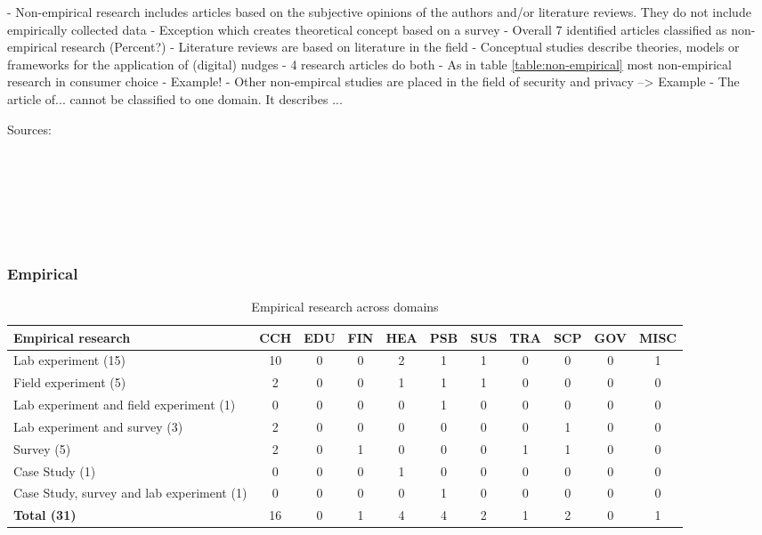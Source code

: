 - Non-empirical research includes articles based on the subjective opinions of the authors and/or literature reviews. They do not include empirically collected data \cite{alavi_review_1992}
- Exception \cite{gamliel_average_2017} which creates theoretical concept based on a survey
- Overall 7 identified articles classified as non-empirical research (Percent?)
- Literature reviews are based on literature in the field
- Conceptual studies describe theories, models or frameworks for the application of (digital) nudges
- 4 research articles do both
- As in table \ref{table:non-empirical} most non-empirical research in consumer choice
- Example! 
- Other non-empircal studies are placed in the field of security and privacy --> Example
- The article of... cannot be classified to one domain. It describes ...


Sources:
\cite{cao_economic_2018} \\
\cite{yoo_consumer_2018} \\
\cite{gamliel_average_2017} \\
\cite{munscher_review_2016} \\
\cite{broniarczyk_decision_2014} \\
\cite{lades_impulsive_2014} \\
\cite{dolan_influencing_2012} \\


\subsubsection{Empirical}
\begin{table}[htbp]
\small
\centering
\begin{tabular}{p{3.6cm}|cccccccccc}
\textbf{Empirical research} & \textbf{CCH} & \textbf{EDU} & \textbf{FIN} & \textbf{HEA} & \textbf{PSB} & \textbf{SUS} & \textbf{TRA} & \textbf{SCP} & \textbf{GOV} & \textbf{MISC} \\ \hline
Lab experiment (15) & 10 & 0 & 0 & 2 & 1 & 1 & 0 & 0 & 0 & 1 \\
Field experiment (5) & 2 & 0 & 0 & 1 & 1 & 1 & 0 & 0 & 0 & 0 \\
Lab experiment and field experiment (1) & 0 & 0 & 0 & 0 & 1 & 0 & 0 & 0 & 0 & 0 \\
Lab experiment and survey (3) & 2 & 0 & 0 & 0 & 0 & 0 & 0 & 1 & 0 & 0 \\
Survey (5) & 2 & 0 & 1 & 0 & 0 & 0 & 1 & 1 & 0 & 0 \\
Case Study (1) & 0 & 0 & 0 & 1 & 0 & 0 & 0 & 0 & 0 & 0 \\
Case Study, survey and lab experiment (1) & 0 & 0 & 0 & 0 & 1 & 0 & 0 & 0 & 0 & 0 \\ \hline
\textbf{Total (31)} & 16 & 0 & 1 & 4 & 4 & 2 & 1 & 2 & 0 & 1
\end{tabular}
\caption{Empirical research across domains}
\label{table:empirical}
\end{table}

